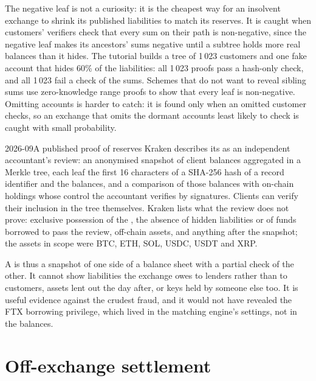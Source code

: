 The negative leaf is not a curiosity: it is the cheapest way for an insolvent exchange to shrink its
published liabilities to match its reserves. It is caught when customers' verifiers check that every sum
on their path is non-negative, since the negative leaf makes its ancestors' sums negative until a subtree
holds more real balances than it hides. The tutorial builds a tree of 1\,023 customers and one fake
account that hides 60\% of the liabilities: all 1\,023 proofs pass a hash-only check, and all 1\,023 fail
a check of the sums. Schemes that do not want to reveal sibling sums use zero-knowledge range proofs to show
that every leaf is non-negative. Omitting accounts is harder to catch: it is found only when an omitted
customer checks, so an exchange that omits the dormant accounts least likely to check is caught with small
probability.

\begin{dated}{2026-09}{A published proof of reserves}\label{dat:m3:centralised-exchanges:kraken}
Kraken describes its  as an independent accountant's review: an anonymised snapshot of
client balances aggregated in a Merkle tree, each leaf the first 16 characters of a SHA-256 hash of a record
identifier and the balances, and a comparison of those balances with on-chain holdings whose control the
accountant verifies by signatures. Clients can verify their inclusion in the tree themselves. Kraken lists
what the review does not prove: exclusive possession of the , the absence of hidden liabilities
or of funds borrowed to pass the review, off-chain assets, and anything after the snapshot; the assets in
scope were BTC, ETH, SOL, USDC, USDT and XRP.
\end{dated}

A  is thus a snapshot of one side of a balance sheet with a partial check of the other.
It cannot show liabilities the exchange owes to lenders rather than to customers, assets lent out the day
after, or keys held by someone else too. It is useful evidence against the crudest fraud, and it would not
have revealed the FTX borrowing privilege, which lived in the matching engine's settings, not in the
balances.

\section{Off-exchange settlement}

